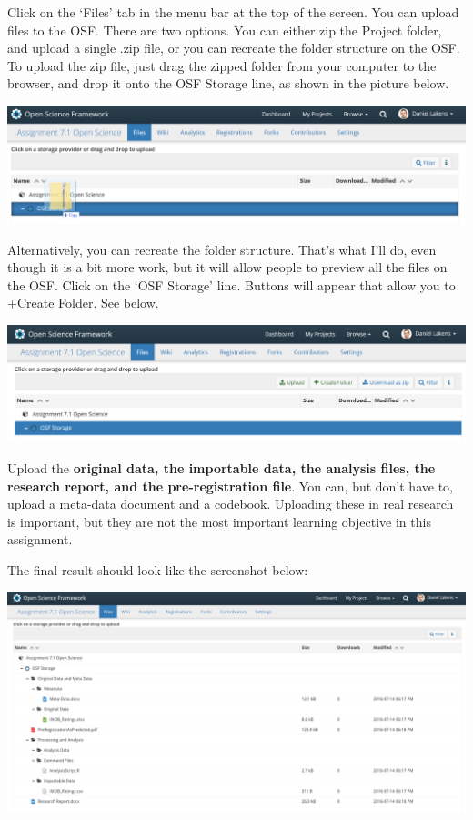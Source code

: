\documentclass[
  oneside]{book}
\begin{document}
Click on the `Files' tab in the menu bar at the top of the screen. You can upload files to the OSF. There are two options. You can either zip the Project folder, and upload a single .zip file, or you can recreate the folder structure on the OSF. To upload the zip file, just drag the zipped folder from your computer to the browser, and drop it onto the OSF Storage line, as shown in the picture below.

\begin{center}\includegraphics[width=1\linewidth]{images/8b43efb2aa9c69d3e8786473113660ba} \end{center}

Alternatively, you can recreate the folder structure. That's what I'll do, even though it is a bit more work, but it will allow people to preview all the files on the OSF. Click on the `OSF Storage' line. Buttons will appear that allow you to +Create Folder. See below.

\begin{center}\includegraphics[width=1\linewidth]{images/380c79d73f62591732aafcd0a045ea2b} \end{center}

Upload the \textbf{original data, the importable data, the analysis files, the research report, and the pre-registration file}. You can, but don't have to, upload a meta-data document and a codebook. Uploading these in real research is important, but they are not the most important learning objective in this assignment.

The final result should look like the screenshot below:

\begin{center}\includegraphics[width=1\linewidth]{images/dec08b890995634acf624123962ed970} \end{center}
\end{document}
